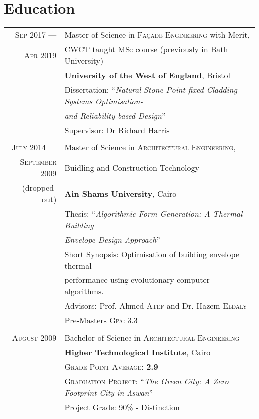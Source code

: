 \documentclass[a4paper,11pt]{article} %
\begin{document}
\section{Education}
\begin{tabular}{r|l}	

\textsc{Sep} 2017 --- & Master of Science in \textsc{Façade Engineering} \scriptsize{with Merit},\\ 
\textsc{Apr} 2019 & \small CWCT taught MSc course (previously in Bath University)\\
&\textbf{University of the West of England}, Bristol\\
& Dissertation: ``\emph{Natural Stone Point-fixed Cladding Systems Optimisation- }\\
&\emph{and Reliability-based Design}'' \\
&\small Supervisor: Dr Richard Harris \\
\multicolumn{2}{c}{} \\

	
\textsc{July} 2014 --- & Master of Science in \textsc{Architectural Engineering},\\ 
\textsc{September} 2009 & Buidling and Construction Technology\\
\small(dropped-out)& \textbf{Ain Shams University}, Cairo \\
& Thesis: ``\emph{Algorithmic Form Generation: A Thermal Building}\\
&\emph{Envelope Design Approach}'' \\
&\small Short Synopsis: Optimisation of building envelope thermal\\
&\small performance using evolutionary computer algorithms.\\
& \small Advisors: Prof. Ahmed \textsc{Atef} and Dr. Hazem \textsc{Eldaly}\\
&\normalsize Pre-Masters \textsc{Gpa}: 3.3\\
\multicolumn{2}{c}{} \\


\textsc{August} 2009& Bachelor of Science in \textsc{Architectural Engineering} \\
& \normalsize\textbf{Higher Technological Institute}, Cairo\\
&\small \textsc{Grade Point Average}: \textbf{2.9} \\
&\small \textsc{Graduation Project:} ``\emph{The Green City: A Zero Footprint City in Aswan}''\\
&\small Project Grade: 90\% - Distinction\\

\end{tabular}
\end{document}
